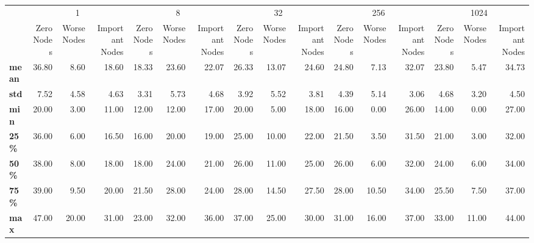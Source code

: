 \begin{tabular}{lrrrrrrrrrrrrrrr}
\toprule
{} & \multicolumn{3}{c}{1} & \multicolumn{3}{c}{8} & \multicolumn{3}{c}{32} & \multicolumn{3}{c}{256} & \multicolumn{3}{c}{1024} \\
{} & Zero Nodes & Worse Nodes & Important Nodes & Zero Nodes & Worse Nodes & Important Nodes & Zero Nodes & Worse Nodes & Important Nodes & Zero Nodes & Worse Nodes & Important Nodes & Zero Nodes & Worse Nodes & Important Nodes \\
\midrule
\textbf{mean} &      36.80 &        8.60 &           18.60 &      18.33 &       23.60 &           22.07 &      26.33 &       13.07 &           24.60 &      24.80 &        7.13 &           32.07 &      23.80 &        5.47 &           34.73 \\
\textbf{std } &       7.52 &        4.58 &            4.63 &       3.31 &        5.73 &            4.68 &       3.92 &        5.52 &            3.81 &       4.39 &        5.14 &            3.06 &       4.68 &        3.20 &            4.50 \\
\textbf{min } &      20.00 &        3.00 &           11.00 &      12.00 &       12.00 &           17.00 &      20.00 &        5.00 &           18.00 &      16.00 &        0.00 &           26.00 &      14.00 &        0.00 &           27.00 \\
\textbf{25\% } &      36.00 &        6.00 &           16.50 &      16.00 &       20.00 &           19.00 &      25.00 &       10.00 &           22.00 &      21.50 &        3.50 &           31.50 &      21.00 &        3.00 &           32.00 \\
\textbf{50\% } &      38.00 &        8.00 &           18.00 &      18.00 &       24.00 &           21.00 &      26.00 &       11.00 &           25.00 &      26.00 &        6.00 &           32.00 &      24.00 &        6.00 &           34.00 \\
\textbf{75\% } &      39.00 &        9.50 &           20.00 &      21.50 &       28.00 &           24.00 &      28.00 &       14.50 &           27.50 &      28.00 &       10.50 &           34.00 &      25.50 &        7.50 &           37.00 \\
\textbf{max } &      47.00 &       20.00 &           31.00 &      23.00 &       32.00 &           36.00 &      37.00 &       25.00 &           30.00 &      31.00 &       16.00 &           37.00 &      33.00 &       11.00 &           44.00 \\
\bottomrule
\end{tabular}
